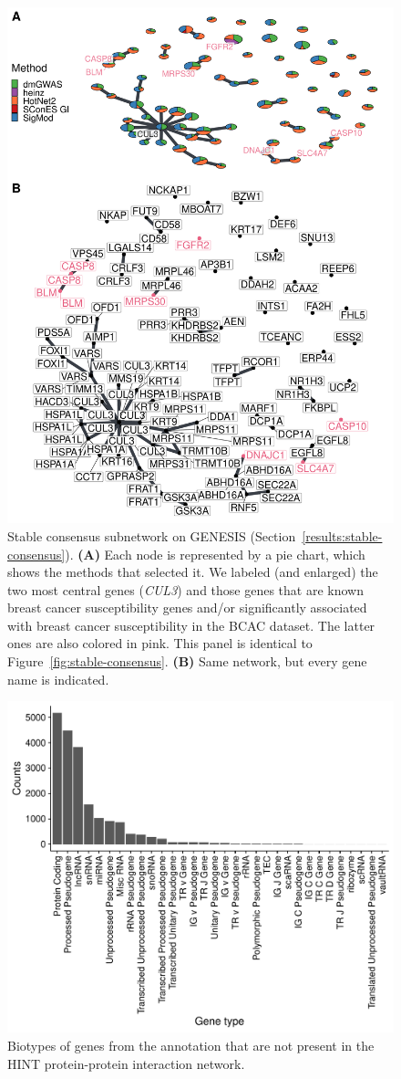 \documentclass[draft,twocolumn, 11pt]{article}
\begin{document}
\begin{figure}[htbp]
  \centering
  \includegraphics[width=.675\linewidth]{./figures/sfigure_6.pdf}
  \caption{Stable consensus subnetwork on GENESIS (Section~\ref{results:stable-consensus}). \textbf{(A)} Each node is represented by a pie chart, which shows the methods that selected it. We labeled (and enlarged) the two most central genes (\emph{CUL3}) and those genes that are known breast cancer susceptibility genes and/or significantly associated with breast cancer susceptibility in the BCAC dataset. The latter ones are also colored in pink. This panel is identical to Figure~\ref{fig:stable-consensus}. \textbf{(B)} Same network, but every gene name is indicated.}
  \label{sfig:stable-consensus-names}
\end{figure}

\begin{figure}[htbp]
\centering
\includegraphics[width=.9\linewidth]{./figures/sfigure_7.pdf}
\caption{Biotypes of genes from the annotation that are not present in the HINT protein-protein interaction network.}
\label{sfig:biotypes_excluded}
\end{figure}
\end{document}
